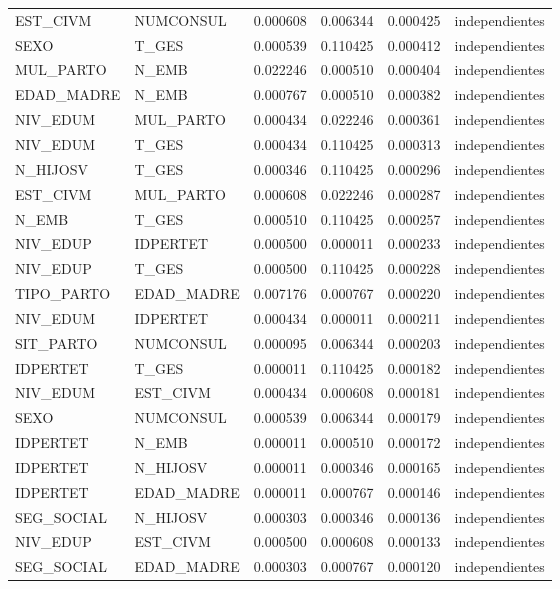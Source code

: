 \begin{tabular}{llrrrl}
EST\_CIVM & NUMCONSUL & 0.000608 & 0.006344 & 0.000425 & independientes \\
SEXO & T\_GES & 0.000539 & 0.110425 & 0.000412 & independientes \\
MUL\_PARTO & N\_EMB & 0.022246 & 0.000510 & 0.000404 & independientes \\
EDAD\_MADRE & N\_EMB & 0.000767 & 0.000510 & 0.000382 & independientes \\
NIV\_EDUM & MUL\_PARTO & 0.000434 & 0.022246 & 0.000361 & independientes \\
NIV\_EDUM & T\_GES & 0.000434 & 0.110425 & 0.000313 & independientes \\
N\_HIJOSV & T\_GES & 0.000346 & 0.110425 & 0.000296 & independientes \\
EST\_CIVM & MUL\_PARTO & 0.000608 & 0.022246 & 0.000287 & independientes \\
N\_EMB & T\_GES & 0.000510 & 0.110425 & 0.000257 & independientes \\
NIV\_EDUP & IDPERTET & 0.000500 & 0.000011 & 0.000233 & independientes \\
NIV\_EDUP & T\_GES & 0.000500 & 0.110425 & 0.000228 & independientes \\
TIPO\_PARTO & EDAD\_MADRE & 0.007176 & 0.000767 & 0.000220 & independientes \\
NIV\_EDUM & IDPERTET & 0.000434 & 0.000011 & 0.000211 & independientes \\
SIT\_PARTO & NUMCONSUL & 0.000095 & 0.006344 & 0.000203 & independientes \\
IDPERTET & T\_GES & 0.000011 & 0.110425 & 0.000182 & independientes \\
NIV\_EDUM & EST\_CIVM & 0.000434 & 0.000608 & 0.000181 & independientes \\
SEXO & NUMCONSUL & 0.000539 & 0.006344 & 0.000179 & independientes \\
IDPERTET & N\_EMB & 0.000011 & 0.000510 & 0.000172 & independientes \\
IDPERTET & N\_HIJOSV & 0.000011 & 0.000346 & 0.000165 & independientes \\
IDPERTET & EDAD\_MADRE & 0.000011 & 0.000767 & 0.000146 & independientes \\
SEG\_SOCIAL & N\_HIJOSV & 0.000303 & 0.000346 & 0.000136 & independientes \\
NIV\_EDUP & EST\_CIVM & 0.000500 & 0.000608 & 0.000133 & independientes \\
SEG\_SOCIAL & EDAD\_MADRE & 0.000303 & 0.000767 & 0.000120 & independientes \\

\end{tabular}
